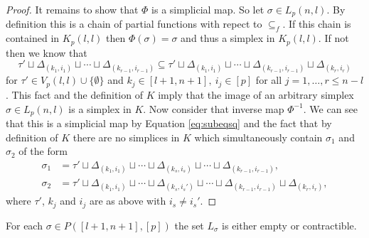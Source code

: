 \begin{proof}
    It remains to show that $\Phi$ is a simplicial map. So let $\sigma \in L_p(n,l)$. By definition this is a chain of partial functions with repect to $\subseteq_f$. If this chain is contained in $K_p(l,l)$ then $\Phi(\sigma) = \sigma$ and thus a simplex in $K_p(l,l)$.
    If not then we know that \begin{equation}\label{eq:subeqsq}
      \tau' \sqcup \Delta_{(k_1, i_1)} \sqcup \cdots \sqcup \Delta_{(k_{r-1}, i_{r-1})} \subseteq \tau' \sqcup \Delta_{(k_1, i_1)} \sqcup \cdots \sqcup \Delta_{(k_{r-1}, i_{r-1})} \sqcup \Delta_{(k_r, i_r)}
    \end{equation}
    for $\tau'\in V_p(l,l) \cup \{\emptyset\}$ and $k_j \in [l+1,n+1], \: i_j \in [p]$ for all $j=1,\ldots,r \leq n-l$. This fact and the definition of $K$ imply that the image of an arbitrary simplex $\sigma\in L_p(n,l)$ is a simplex in $K$. Now consider that inverse map $\Phi^{-1}$. We can see that this is a simplicial map by Equation \ref{eq:subeqsq} and the fact that by definition of $K$ there are no simplices in $K$ which simultaneously contain $\sigma_1$ and $\sigma_2$ of the form
    \begin{align*}
\sigma_1 &= \tau' \sqcup \Delta_{(k_1, i_1)} \sqcup \cdots \sqcup \Delta_{(k_s, i_s)}\sqcup \cdots \sqcup \Delta_{(k_{r-1}, i_{r-1})},\\
\sigma_2 &= \tau' \sqcup \Delta_{(k_1, i_1)} \sqcup \cdots \sqcup \Delta_{(k_s, i_s')}\sqcup \cdots \sqcup \Delta_{(k_{r-1}, i_{r-1})} \sqcup \Delta_{(k_r, i_r)},
    \end{align*}
    where $\tau'$, $k_j$ and $i_j$ are as above with $i_s \neq i_s'$.
\end{proof}

\begin{lemma}\label{lem:Lsigsimeq}
  For each $\sigma \in P([l+1,n+1], [p])$ the set $L_\sigma$ is either empty or contractible.
\end{lemma}

